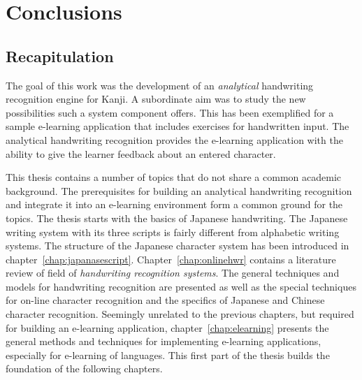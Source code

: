 \chapter{Conclusions}
\label{chap:conclusions}





\section{Recapitulation}
\label{sec:conclusion:recapitulation}

The goal of this work was the development of an \emph{analytical} handwriting
recognition engine for Kanji. A subordinate aim was to study the new 
possibilities such a system component offers. This has been exemplified for
a sample e-learning application that includes exercises for handwritten input.
The analytical handwriting recognition provides the e-learning 
application with the ability to give the learner feedback about an 
entered character.

This thesis contains a number of topics that do not share a common academic 
background. The prerequisites for building an analytical handwriting recognition
and integrate it into an e-learning environment form a common ground for the 
topics. The thesis starts with the basics of Japanese handwriting. The Japanese
writing system with its three scripts is fairly different from alphabetic 
writing systems. The structure of the Japanese character system has been 
introduced in chapter~\ref{chap:japanasescript}.
Chapter~\ref{chap:onlinehwr} contains a literature review of field of 
\emph{handwriting recognition systems}. The general techniques and models
for handwriting recognition are presented as well as the special techniques
for on-line character recognition and the specifics of Japanese and Chinese 
character recognition.
Seemingly unrelated to the previous chapters, but required for building an
e-learning application, chapter~\ref{chap:elearning} presents the general
methods and techniques for implementing e-learning applications, especially 
for e-learning of languages. This first part of the thesis builds the 
foundation of the following chapters.

